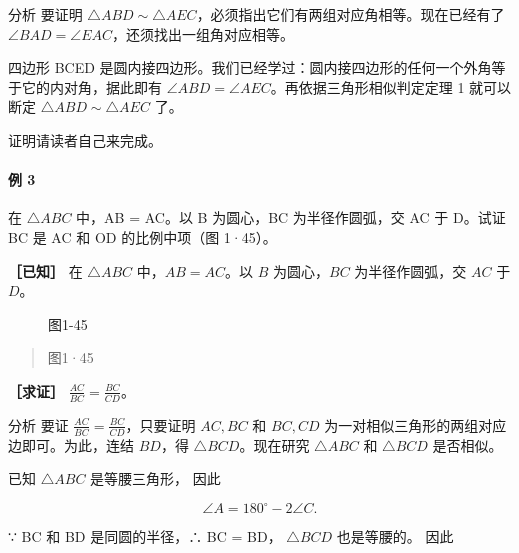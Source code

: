 分析 要证明
\(\triangle ABD \sim \triangle AEC\)，必须指出它们有两组对应角相等。现在已经有了
\(\angle BAD = \angle EAC\)，还须找出一组角对应相等。

四边形 BCED
是圆内接四边形。我们已经学过：圆内接四边形的任何一个外角等于它的内对角，据此即有
\(\angle ABD = \angle AEC\)。再依据三角形相似判定定理 1 就可以断定
\(\triangle ABD \sim \triangle AEC\) 了。

证明请读者自己来完成。

\paragraph{例 3}

在 \(\triangle ABC\) 中，AB = AC。以 B 为圆心，BC 为半径作圆弧，交 AC 于
D。试证 BC 是 AC 和 OD 的比例中项（图 1·45）。

\textbf{［已知］} 在 \(\triangle ABC\) 中，\(AB = AC\)。以 \(B\)
为圆心，\(BC\) 为半径作圆弧，交 \(AC\) 于 \(D\)。

\begin{figure}
\centering
{}
\caption{图1-45}
\end{figure}

\begin{quote}
图1·45
\end{quote}

\textbf{［求证］} \(\frac{AC}{BC} = \frac{BC}{CD}\)。

分析 要证 \(\frac{AC}{BC} = \frac{BC}{CD}\)，只要证明 \(AC, BC\) 和
\(BC, CD\) 为一对相似三角形的两组对应边即可。为此，连结 \(BD\)，得
\(\triangle BCD\)。现在研究 \(\triangle ABC\) 和 \(\triangle BCD\)
是否相似。

已知 \(\triangle ABC\) 是等腰三角形， 因此

\[
\angle A = 180 ^ {\circ} - 2 \angle C. \tag {1}
\]

∵ BC 和 BD 是同圆的半径，∴ BC = BD， \(\triangle BCD\) 也是等腰的。 因此


